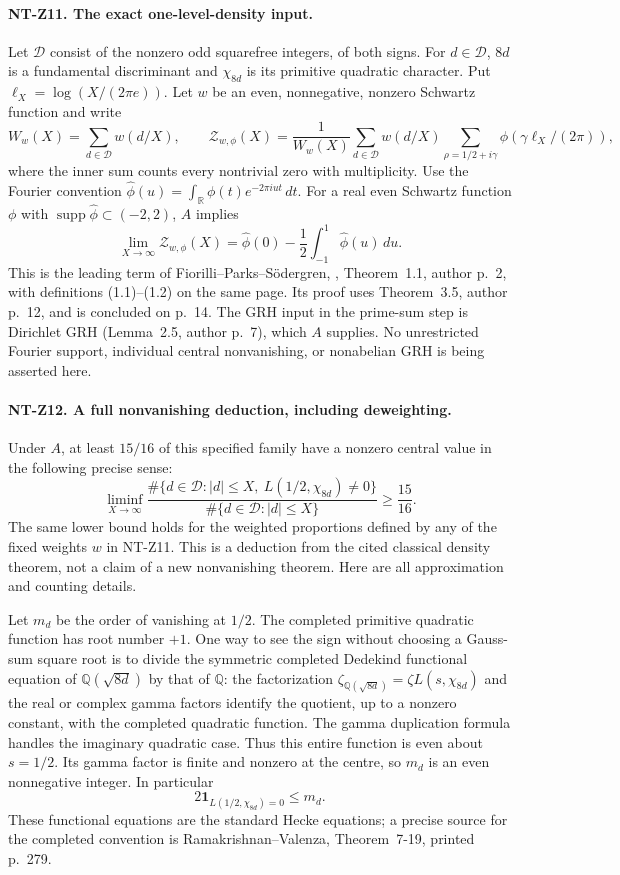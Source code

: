 \documentclass[11pt,a4paper]{article}
\begin{document}
\paragraph{NT-Z11. The exact one-level-density input.}
Let $\mathcal D$ consist of the nonzero odd squarefree integers, of both
signs.  For $d\in\mathcal D$, $8d$ is a fundamental discriminant and
$\chi_{8d}$ is its primitive quadratic character.  Put
$\ell_X=\log(X/(2\pi e))$.  Let $w$ be an even, nonnegative, nonzero
Schwartz function and write
\[
 W_w(X)=\sum_{d\in\mathcal D}w(d/X),\qquad
 \mathcal Z_{w,\phi}(X)=\frac1{W_w(X)}
  \sum_{d\in\mathcal D}w(d/X)
       \sum_{\rho=1/2+i\gamma}\phi(\gamma\ell_X/(2\pi)),
\]
where the inner sum counts every nontrivial zero with multiplicity.
Use the Fourier convention
$\widehat\phi(u)=\int_{\mathbb R}\phi(t)e^{-2\pi iut}\,dt$.
For a real even Schwartz function $\phi$ with
$\operatorname{supp}\widehat\phi\subset(-2,2)$, $A$ implies
\[
 \lim_{X\to\infty}\mathcal Z_{w,\phi}(X)
 =\widehat\phi(0)-\frac12\int_{-1}^1\widehat\phi(u)\,du.
\tag{NT-Z11}
\]
This is the leading term of Fiorilli--Parks--S\"odergren,
, Theorem~1.1, author p.~2, with definitions
(1.1)--(1.2) on the same page.  Its proof uses Theorem~3.5, author p.~12, and is concluded on p.~14.
The GRH input in the prime-sum step is Dirichlet GRH
(Lemma~2.5, author p.~7), which $A$ supplies.  No unrestricted Fourier
support, individual central nonvanishing, or nonabelian GRH is being
asserted here.

\paragraph{NT-Z12. A full nonvanishing deduction, including deweighting.}
Under $A$, at least $15/16$ of this specified family have a nonzero
central value in the following precise sense:
\[
 \liminf_{X\to\infty}
 \frac{\#\{d\in\mathcal D:|d|\le X,\ L(1/2,\chi_{8d})\ne0\}}
      {\#\{d\in\mathcal D:|d|\le X\}}\ge\frac{15}{16}.
\tag{NT-Z12}
\]
The same lower bound holds for the weighted proportions defined by any
of the fixed weights $w$ in NT-Z11.  This is a deduction from the cited
classical density theorem, not a claim of a new nonvanishing theorem.
Here are all approximation and counting details.

Let $m_d$ be the order of vanishing at $1/2$.  The completed primitive
quadratic function has root number $+1$.  One way to see the sign without
choosing a Gauss-sum square root is to divide the symmetric completed
Dedekind functional equation of $\mathbb Q(\sqrt{8d})$ by that of
$\mathbb Q$: the factorization
$\zeta_{\mathbb Q(\sqrt{8d})}=\zeta L(s,\chi_{8d})$ and the real or
complex gamma factors identify the quotient, up to a nonzero constant,
with the completed quadratic function.  The gamma duplication formula
handles the imaginary quadratic case.  Thus this entire function is
even about $s=1/2$.  Its gamma factor is finite and nonzero at the
centre, so $m_d$ is an even nonnegative integer.  In particular
\[
 2\mathbf1_{L(1/2,\chi_{8d})=0}\le m_d.
\tag{NT-central-parity}
\]
These functional equations are the standard Hecke equations; a precise
source for the completed convention is Ramakrishnan--Valenza,
Theorem~7-19, printed p.~279.
\end{document}
